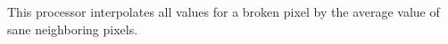 This processor interpolates all values for a broken pixel
by the average value of sane neighboring pixels.